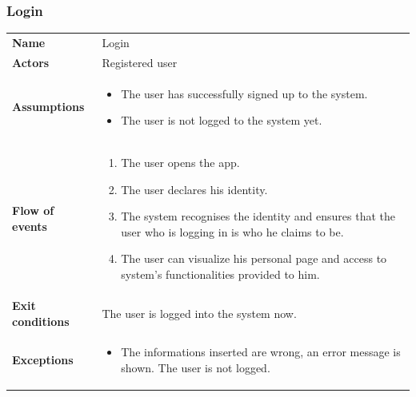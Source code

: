 \documentclass[english]{article}
\begin{document}
		\subsubsection{Login}
		\begin{center}
		\begin{tabular}{l||p{10cm}}
		\textbf{Name} 
			& Login\\ [8px]
		\textbf{Actors} 
			& Registered user\\ [8px]
		\textbf{Assumptions} 
			& \begin{itemize}
				\item The user has successfully signed up to the system.
				\item The user is not logged to the system yet.
			\end{itemize}\\
		\textbf{Flow of events}
			& \begin{enumerate}
	 			\item The user opens the app.
				\item The user declares his identity.
				\item The system recognises the identity and ensures that the user who is logging in is who he claims to be.
				\item The user can visualize his personal page and access to system's functionalities provided to him.
			\end{enumerate}\\ 
		\textbf{Exit conditions}
			& The user is logged into the system now.\\ [8px]
		\textbf{Exceptions}
			& \begin{itemize}
				\item The informations inserted are wrong, an error message is shown. The user is not logged.
			\end{itemize}
		\end{tabular}
		\end{center}
		\vspace*{\fill}
		\noindent
\end{document}
